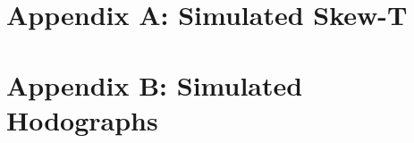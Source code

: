 \newpage
\appendix

\section{Appendix A: Simulated Skew-T}
\lipsum

\section{Appendix B: Simulated Hodographs}
\lipsum
